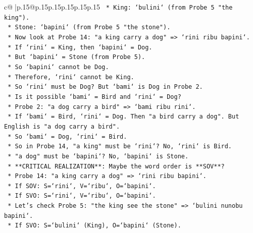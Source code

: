 \documentclass{article}
\begin{document}
{\begin{supertabular}{c@{$\;$}|p{.15\linewidth}@{}p{.15\linewidth}p{.15\linewidth}p{.15\linewidth}p{.15\linewidth}p{.15\linewidth}}
{{{\texttt{                        *   King: `bulini` (from Probe 5 "the king").} \\
\texttt{                        *   Stone: `bapini` (from Probe 5 "the stone").} \\
\texttt{                    *   Now look at Probe 14: "a king carry a dog" => `rini ribu bapini`.} \\
\texttt{                        *   If `rini` = King, then `bapini` = Dog.} \\
\texttt{                        *   But `bapini` = Stone (from Probe 5).} \\
\texttt{                        *   So `bapini` cannot be Dog.} \\
\texttt{                        *   Therefore, `rini` cannot be King.} \\
\texttt{                        *   So `rini` must be Dog? But `bami` is Dog in Probe 2.} \\
\texttt{                        *   Is it possible `bami` = Bird and `rini` = Dog?} \\
\texttt{                            *   Probe 2: "a dog carry a bird" => `bami ribu rini`.} \\
\texttt{                            *   If `bami` = Bird, `rini` = Dog. Then "a bird carry a dog". But English is "a dog carry a bird".} \\
\texttt{                            *   So `bami` = Dog, `rini` = Bird.} \\
\texttt{                        *   So in Probe 14, "a king" must be `rini`? No, `rini` is Bird.} \\
\texttt{                        *   "a dog" must be `bapini`? No, `bapini` is Stone.} \\
\texttt{                        *   **CRITICAL REALIZATION**: Maybe the word order is **SOV**?} \\
\texttt{                            *   Probe 14: "a king carry a dog" => `rini ribu bapini`.} \\
\texttt{                            *   If SOV: S=`rini`, V=`ribu`, O=`bapini`.} \\
\texttt{                            *   If SVO: S=`rini`, V=`ribu`, O=`bapini`.} \\
\texttt{                            *   Let's check Probe 5: "the king see the stone" => `bulini nunobu bapini`.} \\
\texttt{                            *   If SVO: S=`bulini` (King), O=`bapini` (Stone).} \\
}}}
\end{supertabular}}
\end{document}
